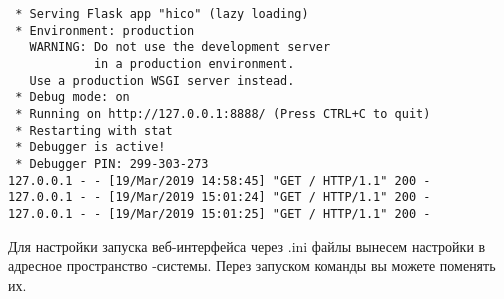 \smallskip
{}

\begin{verbatim}
 * Serving Flask app "hico" (lazy loading)
 * Environment: production
   WARNING: Do not use the development server
            in a production environment.
   Use a production WSGI server instead.
 * Debug mode: on
 * Running on http://127.0.0.1:8888/ (Press CTRL+C to quit)
 * Restarting with stat
 * Debugger is active!
 * Debugger PIN: 299-303-273
127.0.0.1 - - [19/Mar/2019 14:58:45] "GET / HTTP/1.1" 200 -
127.0.0.1 - - [19/Mar/2019 15:01:24] "GET / HTTP/1.1" 200 -
127.0.0.1 - - [19/Mar/2019 15:01:25] "GET / HTTP/1.1" 200 -
\end{verbatim}


Для настройки запуска веб-интерфейса через .ini файлы вынесем настройки в
адресное пространство \F-системы. Перез запуском команды  вы можете
поменять их.

\medskip
{}



\secup
